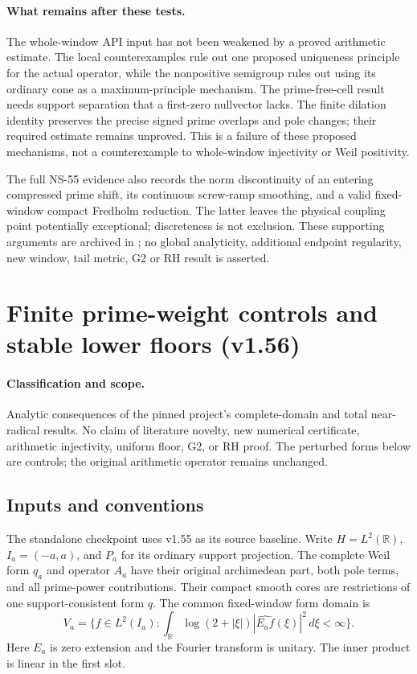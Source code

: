 \documentclass[11pt]{article}
\theoremstyle{remark}
\begin{document}
\paragraph{What remains after these tests.}
The whole-window API input has not been weakened by a proved arithmetic
estimate. The local counterexamples rule out one proposed uniqueness
principle for the actual operator, while the nonpositive semigroup rules
out using its ordinary cone as a maximum-principle mechanism. The
prime-free-cell result needs support separation that a first-zero
nullvector lacks. The finite dilation identity preserves the precise
signed prime overlaps and pole changes; their required estimate remains
unproved. This is a failure of these proposed mechanisms, not a
counterexample to whole-window injectivity or Weil positivity.

The full NS-55 evidence also records the norm discontinuity of an
entering compressed prime shift, its continuous screw-ramp smoothing,
and a valid fixed-window compact Fredholm reduction. The latter leaves
the physical coupling point potentially exceptional; discreteness is
not exclusion. These supporting arguments are archived in
; no global analyticity, additional endpoint
regularity, new window, tail metric, G2 or RH result is asserted.

\section{Finite prime-weight controls and stable lower floors (v1.56)}
\label{sec:v156-prime-weight-controls}

\paragraph{Classification and scope.} Analytic consequences of the pinned project's complete-domain
and total near-radical results. No claim of literature novelty, new numerical
certificate, arithmetic injectivity, uniform floor, G2, or RH proof.
The perturbed forms below are controls; the original arithmetic operator remains unchanged.

\subsection*{Inputs and conventions}
The standalone checkpoint uses v1.55 as its source baseline.
Write $H=L^2(\mathbb R)$, $I_a=(-a,a)$, and $P_a$ for its ordinary support projection.
The complete Weil form $q_a$ and operator $A_a$ have their original
archimedean part, both pole terms, and all prime-power contributions.
Their compact smooth cores are restrictions of one support-consistent form $q$.
The common fixed-window form domain is
\[
 V_a=\{f\in L^2(I_a):\int_\mathbb R\log(2+|\xi|)
           |\widehat{E_af}(\xi)|^2\,d\xi<\infty\}.
\]
Here $E_a$ is zero extension and the Fourier transform is unitary.
The inner product is linear in the first slot.
\end{document}
